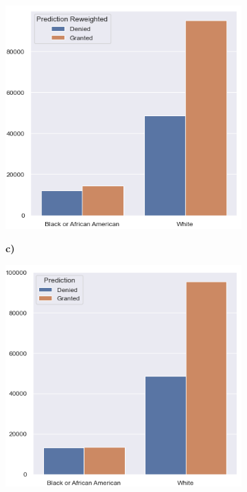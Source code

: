 \begin{figure}[!htbp]
\begin{minipage}[b]{0.5\textwidth}
\begin{subfigure}[t]{0.9\textwidth}
            \includegraphics[width=\linewidth, valign=t]{images/loan_grants_by_protected_attributes/reweighted.png}
        \end{subfigure}
    \end{minipage}%
    \hfill\allowbreak%
    \begin{minipage}[b]{0.5\textwidth}
        \centering
        \begin{subfigure}[t]{0.06\textwidth}
            \textbf{c)}
        \end{subfigure}
        \begin{subfigure}[t]{0.9\textwidth}
            \includegraphics[width=\linewidth, valign=t]{images/loan_grants_by_protected_attributes/correlation_removed.png}

\end{subfigure}
\end{minipage}
\end{figure}
